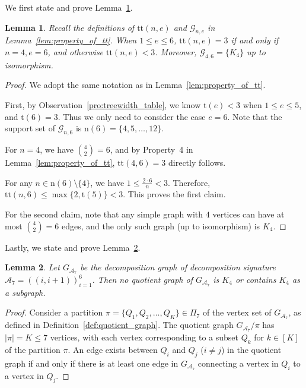 \documentclass[12pt]{article}
\theoremstyle{plain}
\newtheorem{lemma}{Lemma}
\theoremstyle{definition}
\newcommand{\partition}{\Pi}
\newcommand{\partitionp}[1]{\partition_{#1}}
\newcommand{\graphset}{\mathcal{G}}
\newcommand{\graphsetne}[2]{\graphset_{#1,#2}}
\newcommand{\completegraphp}[1]{K_{#1}}
\newcommand{\graphform}[1]{G_{#1}}
\def\calA{\mathcal{A}}
\begin{document}
\begin{bibunit}[agsm]
We first state and prove Lemma~\ref{lem:HOIF_table_lem_1}.
\begin{lemma}
\label{lem:HOIF_table_lem_1}
Recall the definitions of $\mathrm{tt}(n, e)$ and $\graphsetne{n}{e}$ in Lemma~\ref{lem:property_of_tt}. When $1\le e \le  6$, $\mathrm{tt}(n, e) = 3$ if and only if $n = 4, e = 6$, and otherwise $\mathrm{tt}(n, e) < 3$. Moreover, $\graphsetne{4}{6} = \{\completegraphp{4}\}$ up to isomorphism.
\end{lemma}

\begin{proof}
We adopt the same notation as in Lemma~\ref{lem:property_of_tt}.

First, by Observation~\ref{pro:treewidth_table}, we know $\mathrm{t} (e) < 3$ when $1 \le e \le 5$, and $\mathrm{t}(6) = 3$. Thus we only need to consider the case $e = 6$. Note that the support set of $\graphsetne{n}{6}$ is $\mathrm{n}(6) = \{4,5,\dots,12\}$.
    
For $n = 4$, we have $\binom{4}{2} = 6$, and by Property~4 in Lemma~\ref{lem:property_of_tt}, $\mathrm{tt}(4, 6) = 3$ directly follows.  
    
For any $n \in \mathrm{n}(6) \setminus \{4\}$, we have $1 \le \frac{2 \cdot 6}{n} < 3$.  Therefore, $\mathrm{tt}(n, 6) \le \max\{ 2, \mathrm{t}(5) \} < 3$. This proves the first claim.
    
For the second claim, note that any simple graph with $4$ vertices can have at most $\binom{4}{2} = 6$ edges, and the only such graph (up to isomorphism) is $\completegraphp{4}$. 
\end{proof}

Lastly, we state and prove Lemma~\ref{lem:HOIF_table_lem_2}.

\begin{lemma}
\label{lem:HOIF_table_lem_2}
Let $\graphform{\calA_7}$ be the decomposition graph of decomposition signature $\calA_7 = ((i,i+1))_{i=1}^6$. Then no quotient graph of $\graphform{\calA_7}$ is $\completegraphp{4}$ or contains $\completegraphp{4}$ as a subgraph.
\end{lemma}

\begin{proof}
Consider a partition $\pi = \{Q_1, Q_2, \dots, Q_K\} \in \partitionp{7}$ of the vertex set of $\graphform{\calA_7}$, as defined in Definition~\ref{def:quotient_graph}. 
The quotient graph $\graphform{\calA_7} / \pi$ has $|\pi| = K \le 7$ vertices, with each vertex corresponding to a subset $Q_k$ for $k \in [K]$ of the partition $\pi$. An edge exists between $Q_i$ and $Q_j$ ($i \neq j$) in the quotient graph if and only if there is at least one edge in $\graphform{\calA_7}$ connecting a vertex in $Q_i$ to a vertex in $Q_j$.


\end{proof}
\end{bibunit}
\end{document}
